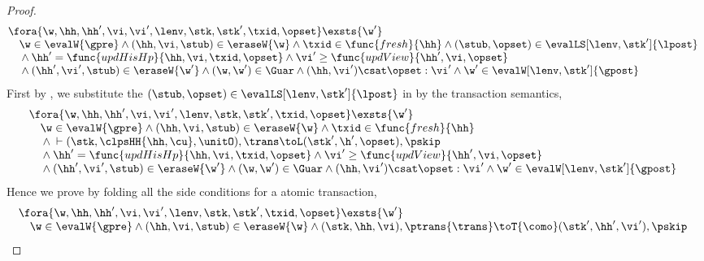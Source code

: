\begin{proof}
\begin{equation}
\label{equ:repartition}
\begin{array}{@{}l}
    \fora{\w,  \hh, \hh', \vi, \vi', \lenv, \stk, \stk', \txid, \opset} \exsts{\w'} \\
    \quad \w \in \evalW{\gpre}
    \land (\hh, \vi, \stub) \in \eraseW{\w}
    \land \txid \in \func{fresh}{\hh} 
    \land (\stub,\opset) \in \evalLS[\lenv, \stk']{\lpost} \\
    \quad {} \land \hh' = \func{updHisHp}{\hh, \vi, \txid, \opset}  
    \land \vi' \geq \func{updView}{\hh', \vi, \opset} \\
    \quad {} \land (\hh',\vi', \stub) \in \eraseW{\w'}
    \land (\w, \w') \in \Guar 
    \land (\hh, \vi') \csat \opset : \vi' 
    \land \w' \in \evalW[\lenv, \stk']{\gpost}
\end{array}
\end{equation}
First by , we substitute the \( (\stub, \opset) \in \evalLS[\lenv, \stk']{\lpost}\) in  by the transaction semantics,
\begin{equation}
\label{equ:combined-transaction-sound}
\begin{array}{@{}l}
    \fora{\w,  \hh, \hh', \vi, \vi', \lenv, \stk, \stk', \txid, \opset} \exsts{\w'} \\
    \quad \w \in \evalW{\gpre}
    \land (\hh, \vi, \stub) \in \eraseW{\w}
    \land \txid \in \func{fresh}{\hh}  \\
    \quad {} \land {} \vdash (\stk, \clpsHH{\hh, \cu}, \unitO), \trans \toL (\stk', \h', \opset), \pskip  \\
    \quad {} \land \hh' = \func{updHisHp}{\hh, \vi, \txid, \opset}  
    \land \vi' \geq \func{updView}{\hh', \vi, \opset} \\
    \quad {} \land (\hh',\vi', \stub) \in \eraseW{\w'}
    \land (\w, \w') \in \Guar 
    \land (\hh, \vi') \csat \opset : \vi' 
    \land \w' \in \evalW[\lenv, \stk']{\gpost}
\end{array}
\end{equation}
Hence we prove  by folding all the side conditions for a atomic transaction,
\[
\begin{array}{@{}l}
    \fora{\w,  \hh, \hh', \vi, \vi', \lenv, \stk, \stk', \txid, \opset} \exsts{\w'} \\
    \quad \w \in \evalW{\gpre}
    \land (\hh, \vi, \stub) \in \eraseW{\w} 
    \land {} (\stk, \hh, \vi), \ptrans{\trans} \toT{\como} (\stk', \hh', \vi'), \pskip  \\

\end{array}\]
\end{proof}
